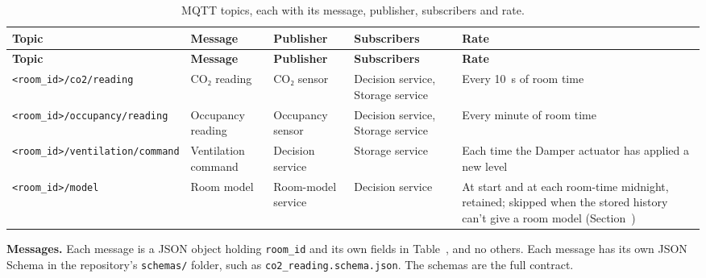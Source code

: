 \documentclass[11pt]{article}
\def\ref#1{\getrefnumber{#1}}%
\begin{document}
\begin{longtable}[]{@{}
  >{\raggedright\arraybackslash}p{}
  >{\raggedright\arraybackslash}p{}
  >{\raggedright\arraybackslash}p{}
  >{\raggedright\arraybackslash}p{}
  >{\raggedright\arraybackslash}p{}@{}}
\caption{MQTT topics, each with its message, publisher, subscribers and
rate.}\label{tab:topics}\\
\toprule
\textbf{Topic} & \textbf{Message} & \textbf{Publisher}
& \textbf{Subscribers} & \textbf{Rate} \\
\midrule
\endfirsthead
\toprule
\textbf{Topic} & \textbf{Message} & \textbf{Publisher}
& \textbf{Subscribers} & \textbf{Rate} \\
\midrule
\endhead
\texttt{<room\_id>/\allowbreak co2/\allowbreak reading} & CO₂ reading & CO₂ sensor
& Decision service, Storage service & Every 10~s of room time \\
\midrule
\texttt{<room\_id>/\allowbreak occupancy/\allowbreak reading} & Occupancy reading
& Occupancy sensor & Decision service, Storage service & Every minute of
room time \\
\midrule
\texttt{<room\_id>/\allowbreak ventilation/\allowbreak command} & Ventilation command
& Decision service & Storage service & Each time the Damper actuator has
applied a new level \\
\midrule
\texttt{<room\_id>/\allowbreak model} & Room model
& Room-model service & Decision service & At start and at each room-time
midnight, retained; skipped when the stored history can't give a room
model (Section~\ref{sec:decision-logic}) \\
\bottomrule
\end{longtable}

\textbf{Messages.} Each message is a JSON object holding
\texttt{room\_id} and its own fields in Table~\ref{tab:fields}, and no
others. Each message has its own JSON Schema in the repository's
\texttt{schemas/} folder, such as \texttt{co2\_reading.schema.json}.
The schemas are the full contract.
\end{document}
